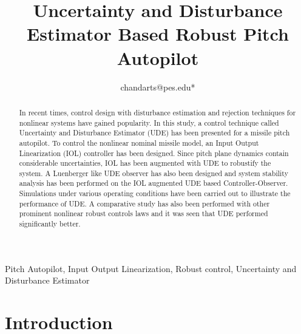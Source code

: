 \documentclass[conference]{IEEEtran}
\begin{document}
\title{Uncertainty and Disturbance Estimator Based Robust Pitch Autopilot}

\author{
 chandarts@pes.edu*
}

\maketitle

\begin{abstract}
	In recent times, control design with disturbance estimation and rejection techniques for nonlinear systems have gained popularity. In this study, a control technique called Uncertainty and Disturbance Estimator (UDE) has been presented for a missile pitch autopilot. To control the nonlinear nominal missile model, an Input Output Linearization (IOL) controller has been designed. Since pitch plane dynamics contain considerable uncertainties, IOL has been augmented with UDE to robustify the system. A Luenberger like UDE observer has also been designed and system stability analysis has been performed on the IOL augmented UDE based Controller-Observer. Simulations under various operating conditions have been carried out to illustrate the performance of UDE. A comparative study has also been performed with other prominent nonlinear robust controls laws and it was seen that UDE performed significantly better.
	 
\end{abstract}

\begin{IEEEkeywords}
	Pitch Autopilot, Input Output Linearization, Robust control, Uncertainty and Disturbance Estimator
\end{IEEEkeywords}

\section{Introduction}
	
\end{document}
